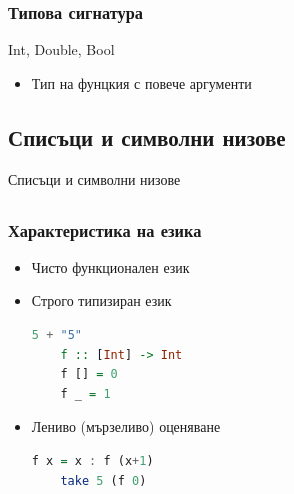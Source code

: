 \documentclass{beamer}
\begin{document}
\begin{frame}[fragile]
  \frametitle{Типова сигнатура}

  Int, Double, Bool

  \begin{itemize}
    \item Тип на фунцкия с повече аргументи
  \end{itemize}

\end{frame}

\subsection{Списъци и символни низове}

\begin{frame}
  \centerline{Списъци и символни низове}
\end{frame}
  

\subsection{}


\begin{frame}[fragile]
  \frametitle{Характеристика на езика}
  
\begin{itemize}
  \item Чисто функционален език
  \item Строго типизиран език
  \begin{lstlisting}[basicstyle=\small, language=Haskell]
    5 + "5"
    f :: [Int] -> Int
    f [] = 0
    f _ = 1
    \end{lstlisting}
  \item Лениво (мързеливо) оценяване
  \begin{lstlisting}[basicstyle=\small, language=Haskell]
    f x = x : f (x+1)
    take 5 (f 0)
  \end{lstlisting}
\end{itemize}


\end{frame}
\end{document}
